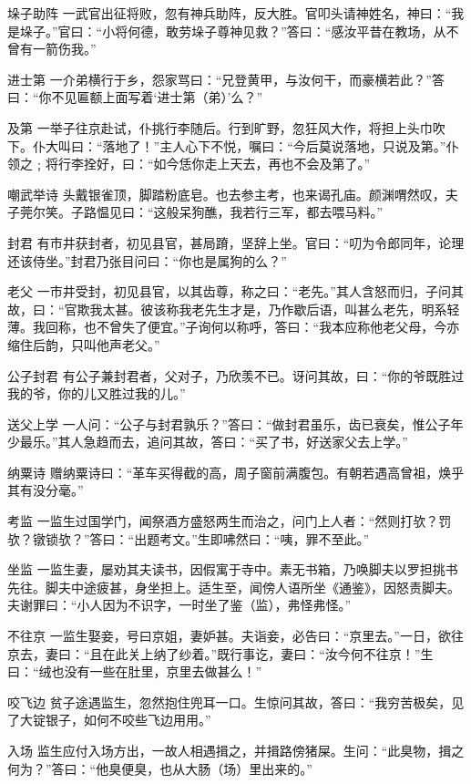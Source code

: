 \documentclass[12pt,UTF8]{ctexbook}
\begin{document}
垛子助阵
一武官出征将败，忽有神兵助阵，反大胜。官叩头请神姓名，神曰：“我是垛子。”官曰：“小将何德，敢劳垛子尊神见救？”答曰：“感汝平昔在教场，从不曾有一箭伤我。”

进士第
一介弟横行于乡，怨家骂曰：“兄登黄甲，与汝何干，而豪横若此？”答曰：“你不见匾额上面写着‘进士第（弟）’么？”

及第
一举子往京赴试，仆挑行李随后。行到旷野，忽狂风大作，将担上头巾吹下。仆大叫曰：“落地了！”主人心下不悦，嘱曰：“今后莫说落地，只说及第。”仆领之﹔将行李拴好，曰：“如今恁你走上天去，再也不会及第了。”

嘲武举诗
头戴银雀顶，脚踏粉底皂。也去参主考，也来谒孔庙。颜渊喟然叹，夫子莞尔笑。子路愠见曰：“这般呆狗醮，我若行三军，都去喂马料。”

封君
有市井获封者，初见县官，甚局蹐，坚辞上坐。官曰：“叨为令郎同年，论理还该侍坐。”封君乃张目问曰：“你也是属狗的么？”

老父
一市井受封，初见县官，以其齿尊，称之曰：“老先。”其人含怒而归，子问其故，曰：“官欺我太甚。彼该称我老先生才是，乃作歇后语，叫甚么老先，明系轻薄。我回称，也不曾失了便宜。”子询何以称呼，答曰：“我本应称他老父母，今亦缩住后韵，只叫他声老父。”

公子封君
有公子兼封君者，父对子，乃欣羡不已。讶问其故，曰：“你的爷既胜过我的爷，你的儿又胜过我的儿。”

送父上学
一人问：“公子与封君孰乐？”答曰：“做封君虽乐，齿已衰矣，惟公子年少最乐。”其人急趋而去，追问其故，答曰：“买了书，好送家父去上学。”

纳粟诗
赠纳粟诗曰：“革车买得截的高，周子窗前满腹包。有朝若遇高曾祖，焕乎其有没分毫。”

考监
一监生过国学门，闻祭酒方盛怒两生而治之，问门上人者：“然则打欤？罚欤？镦锁欤？”答曰：“出题考文。”生即咈然曰：“咦，罪不至此。”

坐监
一监生妻，屡劝其夫读书，因假寓于寺中。素无书箱，乃唤脚夫以罗担挑书先往。脚夫中途疲甚，身坐担上。适生至，闻傍人语所坐《通鉴》，因怒责脚夫。夫谢罪曰：“小人因为不识字，一时坐了鉴（监），弗怪弗怪。”

不往京
一监生娶妾，号曰京姐，妻妒甚。夫诣妾，必告曰：“京里去。”一日，欲往京去，妻曰：“且在此关上纳了纱着。”既行事讫，妻曰：“汝今何不往京！”生曰：“绒也没有一些在肚里，京里去做甚么！”

咬飞边
贫子途遇监生，忽然抱住兜耳一口。生惊问其故，答曰：“我穷苦极矣，见了大锭银子，如何不咬些飞边用用。”

入场
监生应付入场方出，一故人相遇揖之，并揖路傍猪屎。生问：“此臭物，揖之何为？”答曰：“他臭便臭，也从大肠（场）里出来的。”
\end{document}
